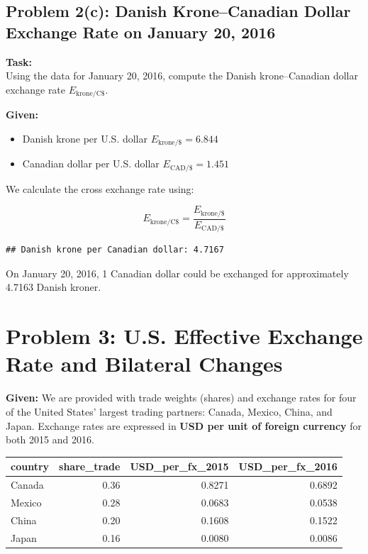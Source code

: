 \documentclass[
]{article}
\providecommand{\tightlist}{%
  \setlength{\itemsep}{0pt}\setlength{\parskip}{0pt}}
\begin{document}
\subsection{Problem 2(c): Danish Krone--Canadian Dollar Exchange Rate on
January 20,
2016}\label{problem-2c-danish-kronecanadian-dollar-exchange-rate-on-january-20-2016}

\textbf{Task:}\\
Using the data for January 20, 2016, compute the Danish krone--Canadian
dollar exchange rate \(E_{\text{krone/C\$}}\).

\textbf{Given:}

\begin{itemize}
\tightlist
\item
  Danish krone per U.S. dollar \(E_{\text{krone/\$}} = 6.844\)
\item
  Canadian dollar per U.S. dollar \(E_{\text{CAD/\$}} = 1.451\)
\end{itemize}

We calculate the cross exchange rate using:

\[
E_{\text{krone/C\$}} = \frac{E_{\text{krone/\$}}}{E_{\text{CAD/\$}}}
\]

\begin{verbatim}
## Danish krone per Canadian dollar: 4.7167
\end{verbatim}

On January 20, 2016, 1 Canadian dollar could be exchanged for
approximately 4.7163 Danish kroner.

\section{Problem 3: U.S. Effective Exchange Rate and Bilateral
Changes}\label{problem-3-u.s.-effective-exchange-rate-and-bilateral-changes}

\textbf{Given:} We are provided with trade weights (shares) and exchange
rates for four of the United States' largest trading partners: Canada,
Mexico, China, and Japan. Exchange rates are expressed in \textbf{USD
per unit of foreign currency} for both 2015 and 2016.

\begin{longtable}[]{@{}lrrr@{}}
\toprule\noalign{}
country & share\_trade & USD\_per\_fx\_2015 & USD\_per\_fx\_2016 \\
\midrule\noalign{}
\endhead
\bottomrule\noalign{}
\endlastfoot
Canada & 0.36 & 0.8271 & 0.6892 \\
Mexico & 0.28 & 0.0683 & 0.0538 \\
China & 0.20 & 0.1608 & 0.1522 \\
Japan & 0.16 & 0.0080 & 0.0086 \\
\end{longtable}
\end{document}
